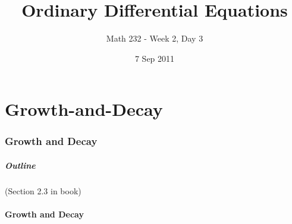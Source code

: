 \part{Growth-and-Decay}
\section{Growth and Decay}

\title{Ordinary Differential Equations}
\subtitle{Math 232 - Week 2, Day 3}
\date{7 Sep 2011}

\begin{frame}
  \titlepage
\end{frame}

\begin{frame}
  \frametitle{Outline}

  (Section 2.3 in book)
\end{frame}


\subsection{Growth and Decay}



